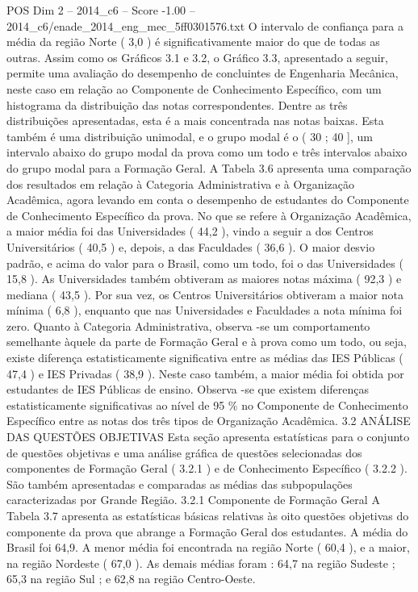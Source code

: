 \begin{textsample}{POS Dim 2 – 2014\_c6 – Score -1.00 – 2014\_c6/enade\_2014\_eng\_mec\_5ff0301576.txt}
O intervalo de confiança para a média da região Norte ( 3,0 ) é significativamente maior do que de todas as outras.
Assim como os Gráficos 3.1 e 3.2, o Gráfico 3.3, apresentado a seguir, permite uma avaliação do desempenho de concluintes de Engenharia Mecânica, neste caso em relação ao Componente de Conhecimento Específico, com um histograma da distribuição das notas correspondentes.
Dentre as três distribuições apresentadas, esta é a mais concentrada nas notas baixas.
Esta também é uma distribuição unimodal, e o grupo modal é o ( 30 ; 40 ], um intervalo abaixo do grupo modal da prova como um todo e três intervalos abaixo do grupo modal para a Formação Geral.
A Tabela 3.6 apresenta uma comparação dos resultados em relação à Categoria Administrativa e à Organização Acadêmica, agora levando em conta o desempenho de estudantes do Componente de Conhecimento Específico da prova.
No que se refere à Organização Acadêmica, a maior média foi das Universidades ( 44,2 ), vindo a seguir a dos Centros Universitários ( 40,5 ) e, depois, a das Faculdades ( 36,6 ).
O maior desvio padrão, e acima do valor para o Brasil, como um todo, foi o das Universidades ( 15,8 ).
As Universidades também obtiveram as maiores notas máxima ( 92,3 ) e mediana ( 43,5 ).
Por sua vez, os Centros Universitários obtiveram a maior nota mínima ( 6,8 ), enquanto que nas Universidades e Faculdades a nota mínima foi zero.
Quanto à Categoria Administrativa, observa -se um comportamento semelhante àquele da parte de Formação Geral e à prova como um todo, ou seja, existe diferença estatisticamente significativa entre as médias das IES Públicas ( 47,4 ) e IES Privadas ( 38,9 ).
Neste caso também, a maior média foi obtida por estudantes de IES Públicas de ensino.
Observa -se que existem diferenças estatisticamente significativas ao nível de 95 \% no Componente de Conhecimento Específico entre as notas dos três tipos de Organização Acadêmica. 3.2 ANÁLISE DAS QUESTÕES OBJETIVAS Esta seção apresenta estatísticas para o conjunto de questões objetivas e uma análise gráfica de questões selecionadas dos componentes de Formação Geral ( 3.2.1 ) e de Conhecimento Específico ( 3.2.2 ).
São também apresentadas e comparadas as médias das subpopulações caracterizadas por Grande Região. 3.2.1 Componente de Formação Geral A Tabela 3.7 apresenta as estatísticas básicas relativas às oito questões objetivas do componente da prova que abrange a Formação Geral dos estudantes.
A média do Brasil foi 64,9.
A menor média foi encontrada na região Norte ( 60,4 ), e a maior, na região Nordeste ( 67,0 ).
As demais médias foram : 64,7 na região Sudeste ; 65,3 na região Sul ; e 62,8 na região Centro-Oeste.

\end{textsample}
